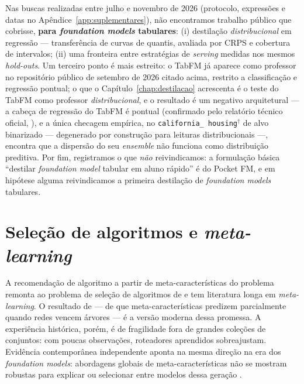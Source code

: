 Nas buscas realizadas entre julho e novembro de 2026 (protocolo,
expressões e datas no Apêndice~\ref{app:suplementares}), não
encontramos trabalho público que cobrisse, \textbf{para
\emph{foundation models} tabulares}: (i) destilação
\emph{distribucional} em regressão --- transferência de curvas de
quantis, avaliada por CRPS e cobertura de intervalos; (ii) uma
fronteira entre estratégias de \emph{serving} medidas nos mesmos
\emph{hold-outs}. Um terceiro ponto é mais estreito: o TabFM já
aparece como professor no repositório público de setembro de 2026
citado acima, restrito a classificação e regressão pontual; o que o
Capítulo~\ref{chap:destilacao} acrescenta é o teste do TabFM como
professor \emph{distribucional}, e o resultado é um negativo
arquitetural --- a cabeça de regressão do TabFM é pontual (confirmado
pelo relatório técnico oficial, \citealp{kong2026}), e a única
checagem empírica, no \texttt{california\_\allowbreak
housing}$^\dagger$ de alvo binarizado --- degenerado por construção
para leituras distribucionais ---, encontra que a dispersão do
seu \emph{ensemble} não funciona como distribuição
preditiva. Por fim,
registramos o que \emph{não} reivindicamos: a formulação básica
``destilar \emph{foundation model} tabular em aluno rápido'' é do Pocket FM,
e em hipótese alguma reivindicamos a primeira destilação de \emph{foundation
models} tabulares.

\section{Seleção de algoritmos e \emph{meta-learning}}
\label{sec:rel-selecao}

A recomendação de algoritmo a partir de
meta-características do problema remonta ao problema de seleção de
algoritmos de \citet{rice1976} e tem literatura longa em
\emph{meta-learning}. O resultado de \citet{mcelfresh2023} --- de que
meta-características predizem parcialmente quando redes vencem árvores ---
é a versão moderna dessa promessa. A experiência histórica, porém, é de
fragilidade fora de grandes coleções de conjuntos: com poucas observações,
roteadores aprendidos sobreajustam. Evidência contemporânea independente
aponta na mesma direção na era dos \emph{foundation models}: abordagens
globais de meta-características não se mostram robustas para explicar ou
selecionar entre modelos dessa geração \citep{herre2026}.

